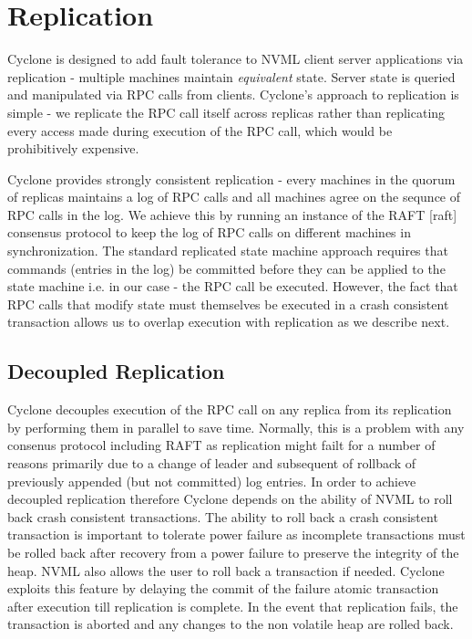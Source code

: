 \documentclass[twocolumn]{article}
\begin{document}
\section{Replication}
Cyclone is designed to add fault tolerance to NVML client server applications
via replication - multiple machines maintain \emph{equivalent} state. Server
state is queried and manipulated via RPC calls from clients. Cyclone's approach
to replication is simple - we replicate the RPC call itself across replicas
rather than replicating every access made during execution of the RPC call,
which would be prohibitively expensive.

Cyclone provides strongly consistent replication - every machines in the quorum of
replicas maintains a log of RPC calls and all machines agree on the sequnce of
RPC calls in the log. We achieve this by running an instance of the RAFT [raft]
consensus protocol to keep the log of RPC calls on different machines in
synchronization. The standard replicated state machine approach requires that
commands (entries in the log) be committed before they can be applied to the
state machine i.e. in our case - the RPC call be executed. However, the fact
that RPC calls that modify state must themselves be executed in a crash
consistent transaction allows us to overlap execution with replication as we
describe next.

\subsection{Decoupled Replication}
Cyclone decouples execution of the RPC call on any replica from its replication
by performing them in parallel to save time. Normally, this is a problem with
any consenus protocol including RAFT as replication might failt for a number of
reasons primarily due to a change of leader and subsequent of rollback of
previously appended (but not committed) log entries. In order to achieve
decoupled replication therefore Cyclone depends on the ability of NVML to roll
back crash consistent transactions. The ability to roll back a crash consistent
transaction is important to tolerate power failure as incomplete transactions
must be rolled back after recovery from a power failure to preserve the
integrity of the heap. NVML also allows the user to roll back a transaction if
needed. Cyclone exploits this feature by delaying the commit of the failure
atomic transaction after execution till replication is complete. In the event
that replication fails, the transaction is aborted and any changes to the non
volatile heap are rolled back.
\end{document}
